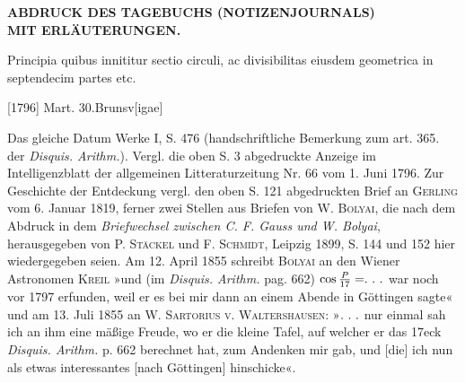 \clearpage{}\NoSourceHead
{}
\begin{center}\bfseries
ABDRUCK DES TAGEBUCHS (NOTIZENJOURNALS)\\
MIT ERLÄUTERUNGEN.
\end{center}
\begingroup
\newcommand{\DiaryCeres}{\tikz[baseline=-.1ex,x=1.8ex,y=1.8ex,line width=.06em]{\draw (.05,.65) .. controls (.28,1.13) and (.85,1.03) .. (.8,.55) .. controls (.8,.12) and (.15,.12) .. (.03,.42);\draw (.1,.4)--(.1,-.15);\draw (-.08,.05)--(.34,.05);}}
\newcommand{\DiaryPallas}{\tikz[baseline=-.1ex,x=1.8ex,y=1.8ex,line width=.06em]{\draw (0,.45)--(.35,1)--(.7,.45)--cycle;\draw (.35,.45)--(.35,-.15);\draw (.12,.1)--(.58,.1);}}
\indent Principia quibus innititur sectio circuli, ac divisibilitas eiusdem geometrica in septendecim partes etc.
\par\noindent\hfill[1796] Mart. 30.\quad Brunsv[igae]

\medskip\begingroup\small
\indent Das gleiche Datum Werke I, S. 476 (handschriftliche Bemerkung zum art. 365. der \textit{Disquis. Arithm.}). Vergl. die oben S. 3 abgedruckte Anzeige im Intelligenzblatt der allgemeinen Litteraturzeitung Nr. 66 vom 1. Juni 1796. Zur Geschichte der Entdeckung vergl. den oben S. 121 abgedruckten Brief an \textsc{Gerling} vom 6. Januar 1819, ferner zwei Stellen aus Briefen von W. \textsc{Bolyai}, die nach dem Abdruck in dem \textit{Briefwechsel zwischen C. F. Gauss und W. Bolyai}, herausgegeben von P. \textsc{Stäckel} und F. \textsc{Schmidt}, Leipzig 1899, S. 144 und 152 hier wiedergegeben seien. Am 12. April 1855 schreibt \textsc{Bolyai} an den Wiener Astronomen \textsc{Kreil} »und (im \textit{Disquis. Arithm.} pag. 662) \(\cos\frac{P}{17}=\ldotp\,\ldotp\,\ldotp\) war noch vor 1797 erfunden, weil er es bei mir dann an einem Abende in Göttingen sagte« und am 13. Juli 1855 an W. \textsc{Sartorius v. Waltershausen}: »\(\ldotp\,\ldotp\,\ldotp\) nur einmal sah ich an ihm eine mäßige Freude, wo er die kleine Tafel, auf welcher er das 17eck \textit{Disquis. Arithm.} p. 662 berechnet hat, zum Andenken mir gab, und [die] ich nun als etwas interessantes [nach Göttingen] hinschicke«.

